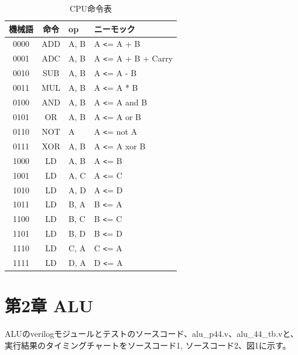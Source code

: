 \documentclass[12pt]{jreport}
\begin{document}
            \begin{table}[htb]
              \begin{center}
                \caption{CPU命令表}
                \begin{tabular} {|c|c|l||l|} \hline
                  機械語 & 命令 & op & ニーモック \\ \hline \hline
                  0000 & ADD & A, B & A \verb|<|= A + B \\ \hline
                  0001 & ADC & A, B & A \verb|<|= A + B + Carry \\ \hline
                  0010 & SUB & A, B & A \verb|<|= A - B \\ \hline
                  0011 & MUL & A, B & A \verb|<|= A * B \\ \hline

                  0100 & AND & A, B & A \verb|<|= A and B \\ \hline
                  0101 & OR & A, B & A \verb|<|= A or B \\ \hline
                  0110 & NOT & A & A \verb|<|= not A \\ \hline
                  0111 & XOR & A, B & A \verb|<|= A xor B \\ \hline

                  1000 & LD & A, B & A \verb|<|= B \\ \hline
                  1001 & LD & A, C & A \verb|<|= C \\ \hline
                  1010 & LD & A, D & A \verb|<|= D \\ \hline
                  1011 & LD & B, A & B \verb|<|= A \\ \hline

                  1100 & LD & B, C & B \verb|<|= C \\ \hline
                  1101 & LD & B, D & B \verb|<|= D \\ \hline
                  1110 & LD & C, A & C \verb|<|= A \\ \hline
                  1111 & LD & D, A & D \verb|<|= A \\ \hline
                \end{tabular}
              \end{center}
            \end{table}

    \chapter*{第2章 ALU}
        ALUのverilogモジュールとテストのソースコード、alu\_p44.v、alu\_44\_tb.vと、実行結果のタイミングチャートをソースコード1, ソースコード2、図1に示す。
\end{document}
